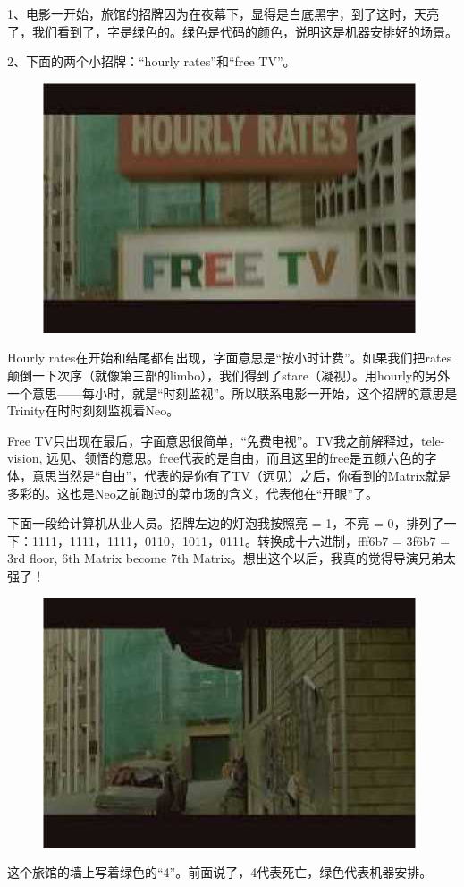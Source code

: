 \documentclass{ctexart}
\begin{document}
1、电影一开始，旅馆的招牌因为在夜幕下，显得是白底黑字，到了这时，天亮了，我们看到了，字是绿色的。绿色是代码的颜色，说明这是机器安排好的场景。

2、下面的两个小招牌：“hourly rates”和“free TV”。

\begin{figure}[!h]
\centering
\includegraphics[width=0.5\linewidth]{fig/read_Matrix-86}
\end{figure}

Hourly rates在开始和结尾都有出现，字面意思是“按小时计费”。如果我们把rates颠倒一下次序（就像第三部的limbo），我们得到了stare（凝视）。用hourly的另外一个意思——每小时，就是“时刻监视”。所以联系电影一开始，这个招牌的意思是Trinity在时时刻刻监视着Neo。

Free TV只出现在最后，字面意思很简单，“免费电视”。TV我之前解释过，tele-vision, 远见、领悟的意思。free代表的是自由，而且这里的free是五颜六色的字体，意思当然是“自由”，代表的是你有了TV（远见）之后，你看到的Matrix就是多彩的。这也是Neo之前跑过的菜市场的含义，代表他在“开眼”了。

下面一段给计算机从业人员。招牌左边的灯泡我按照亮 = 1，不亮 = 0，排列了一下：1111，1111，1111，0110，1011，0111。转换成十六进制，fff6b7 = 3f6b7 = 3rd floor, 6th Matrix become 7th Matrix。想出这个以后，我真的觉得导演兄弟太强了！

\begin{figure}[htb]
\centering
\includegraphics[width=0.5\linewidth]{fig/read_Matrix-87}
\end{figure}

这个旅馆的墙上写着绿色的“4”。前面说了，4代表死亡，绿色代表机器安排。
\end{document}
